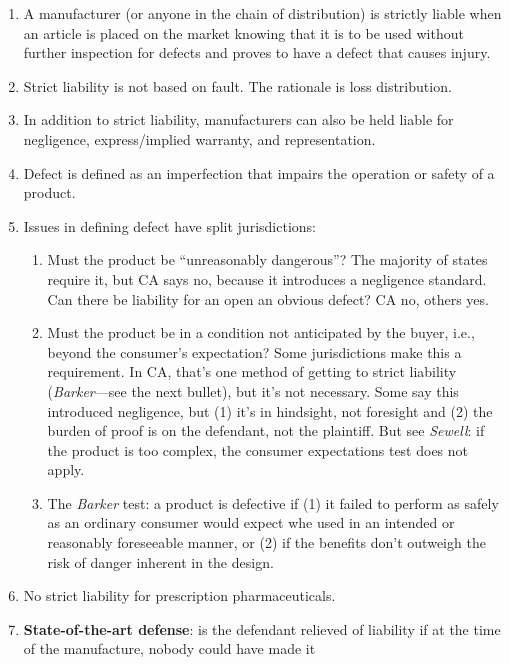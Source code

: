 \begin{enumerate}
    \item A manufacturer (or anyone in the chain of distribution) is strictly 
    liable when an article is placed on the market knowing that it is to be used 
    without further inspection for defects and proves to have a defect that 
    causes injury.
    \item Strict liability is not based on fault. The rationale is loss 
    distribution.
    \item In addition to strict liability, manufacturers can also be held liable 
    for negligence, express/implied warranty, and representation.
    \item Defect is defined as an imperfection that impairs the operation or 
    safety of a product.
    \item Issues in defining defect have split jurisdictions:
    \begin{enumerate}
        \item Must the product be ``unreasonably dangerous''? The majority of 
        states require it, but CA says no, because it introduces a negligence 
        standard. Can there be liability for an open an obvious defect? CA no, 
        others yes.
        \item Must the product be in a condition not anticipated by the buyer, 
        i.e., beyond the consumer's expectation? Some jurisdictions make this a 
        requirement. In CA, that's one method of getting to strict liability 
        (\emph{Barker}---see the next bullet), but it's not necessary. Some say this introduced 
        negligence, but (1) it's in hindsight, not foresight and (2) the burden 
        of proof is on the defendant, not the plaintiff. But see \emph{Sewell}: 
        if the product is too complex, the consumer expectations test does not 
        apply.
        \item The \emph{Barker} test: a product is defective if (1) it failed 
        to perform as safely as an ordinary consumer would expect whe used in 
        an intended or reasonably foreseeable manner, or (2) if the benefits 
        don't outweigh the risk of danger inherent in the design.
    \end{enumerate}
    \item No strict liability for prescription pharmaceuticals.
    \item \textbf{State-of-the-art defense}: is the defendant relieved of 
    liability if at the time of the manufacture, nobody could have made it 

\end{enumerate}
